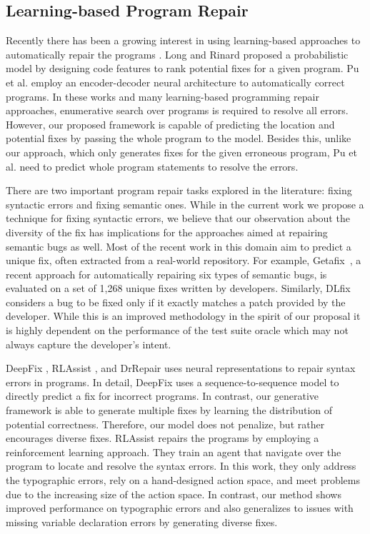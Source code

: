 \documentclass[runningheads]{llncs}
\begin{document}
\subsection{Learning-based Program Repair}
\label{rw_program_repair}
Recently there has been a growing interest in using learning-based approaches to automatically repair the programs \cite{monperrus2018automatic}.  Long and
Rinard \cite{long2016automatic} proposed a probabilistic model by designing code features to rank potential fixes for a given program.  Pu et al. \cite{pu2016sk_p} employ an encoder-decoder neural architecture to automatically correct programs. In these works and many learning-based programming repair approaches, enumerative search over programs is required to resolve all errors. However, our proposed framework is capable of predicting the location and potential fixes by passing the whole program to the model. Besides this, unlike our approach, which only generates fixes for the given erroneous program, Pu et al. \cite{pu2016sk_p} need to predict whole program statements to resolve the errors.

There are two important program repair tasks explored in the literature: fixing syntactic errors and fixing semantic ones. While in the current work we propose a technique for fixing syntactic errors, we believe that our observation about the diversity of the fix has implications for the approaches aimed at repairing semantic bugs as well. Most of the recent work in this domain aim to predict a unique fix, often extracted from a real-world repository. For example, Getafix~\cite{BaderSP019}, a recent approach for automatically repairing six types of semantic bugs, is evaluated on a set of 1,268 unique fixes written by developers. Similarly, DLfix~\cite{li2020dlfix} considers a bug to be fixed only if it exactly matches a patch provided by the developer. 
While this is an improved methodology in the spirit of our proposal it is highly dependent on the performance of the test suite oracle which may not always capture the developer's intent.

DeepFix \cite{Gupta2017DeepFixFC}, RLAssist \cite{gupta2019RLAssist}, and DrRepair \cite{yasunaga2020repair} uses neural representations to repair syntax errors in programs. In detail, DeepFix \cite{Gupta2017DeepFixFC} uses a sequence-to-sequence model to directly predict a fix for incorrect programs. In contrast, our generative framework is able to generate multiple fixes by learning the distribution of potential correctness. Therefore, our model does not penalize, but rather encourages diverse fixes. RLAssist \cite{gupta2019RLAssist} repairs the programs by employing a reinforcement learning approach. They train an agent that navigate over the program to locate and resolve the syntax errors. In this work, they only address the typographic errors, rely on a hand-designed action space, and meet problems due to the increasing size of the action space. In contrast, our method shows improved performance on typographic errors and also generalizes to issues with missing variable declaration errors by generating diverse fixes. 
\end{document}
